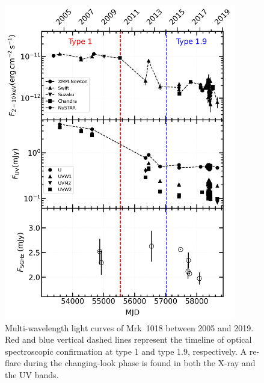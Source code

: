 \begin{figure}
\centering
	\includegraphics[width=0.9\textwidth]{./pic/subplots-xrt_uvot-radio-second.png}
    \caption{Multi-wavelength light curves of Mrk~1018 between 2005 and 2019. Red and blue vertical dashed lines represent the timeline of optical spectroscopic confirmation at type 1 and type 1.9, respectively. A re-flare during the changing-look phase is found in both the X-ray and the UV bands.}
    \label{fig:multi-lc-secondaxis}
\end{figure}


  







